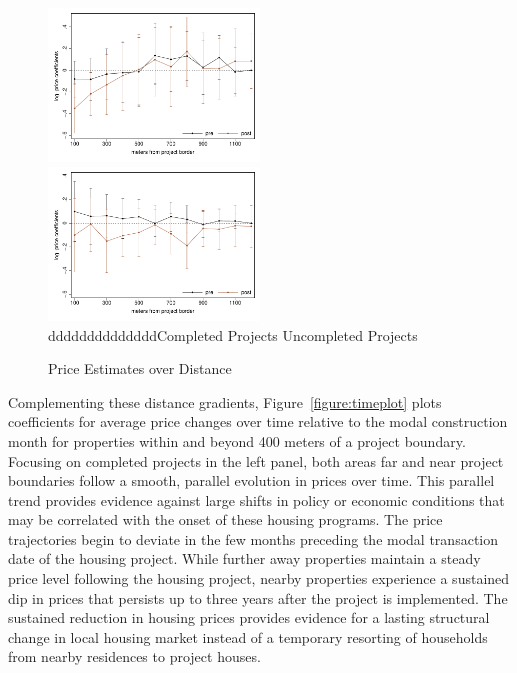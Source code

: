 \documentclass[12pt]{article}
\begin{document}
\begin{figure}
\caption{Price Estimates over Distance}\label{figure:distplot}
\includegraphics[width=0.5\textwidth,trim={.77cm 0cm .21cm 0cm}]{figures/distplot.pdf}
\includegraphics[width=0.5\textwidth,trim={.77cm 0cm .21cm 0cm},clip]{figures/distplot_placebo.pdf}\\
{\color{white}dddddddddddddd}Completed Projects \hspace{4.2cm} Uncompleted Projects
\end{figure}

Complementing these distance gradients, Figure~\ref{figure:timeplot} plots coefficients for average price changes over time relative to the modal construction month for properties within and beyond 400 meters of a project boundary.  Focusing on completed projects in the left panel, both areas far and near project boundaries follow a smooth, parallel evolution in prices over time.  This parallel trend provides evidence against large shifts in policy or economic conditions that may be correlated with the onset of these housing programs.  The price trajectories begin to deviate in the few months preceding the modal transaction date of the housing project.  While further away properties maintain a steady price level following the housing project, nearby properties experience a sustained dip in prices that persists up to three years after the project is implemented.  The sustained reduction in housing prices provides evidence for a lasting structural change in local housing market instead of a temporary resorting of households from nearby residences to project houses.  
\end{document}
